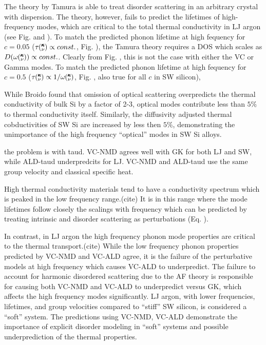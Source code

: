 \documentclass[aps,prb,twocolumn,superscriptaddress,amsmath,amssymb,floatfix]{revtex4}
\newcommand{\kv}{\mspace{-4.0mu}\left(\mspace{-8.0mu}
\begin{smallmatrix}&\pmb{\kappa} \\&\nu\end{smallmatrix}
\mspace{-3.0mu}\right)}
\begin{document}
The theory by Tamura is able to treat disorder scattering in an arbitrary 
crystal with dispersion. The theory, however, fails to predict the 
lifetimes of high-frequency modes, which are critical to the total 
thermal conductivity in LJ argon (see Fig. and ). To match the predicted 
phonon lifetime at high fequency for $c=0.05$ 
($\tau\kv \propto const.$, Fig. ), 
the Tamura theory requires a DOS which scales as 
$D(\omega\kv) \propto const.$. Clearly from Fig. , this is not the case 
with either the VC or Gamma modes. To match the predicted 
phonon lifetime at high fequency for $c=0.5$ 
($\tau\kv \propto 1/\omega\kv$, Fig. , also true for all $c$ in SW silicon), 

While Broido found that omission of optical scattering overpredicts 
the thermal 
conductivity of bulk Si by a factor of 2-3, 
optical modes contribute less than $5\%$ 
to thermal conductivity itself. Similarly, the diffusivity adjusted thermal 
cobductivities of SW Si are increased by less then $5\%$, demonstrating the 
unimportance of the high frequency ``optical'' modes in SW Si alloys.

the problem is with taud.  VC-NMD agrees well with GK for both LJ and SW, 
while ALD-taud underpredcits for LJ.  VC-NMD and ALD-taud use the same 
group velocity and classical specific heat.



High thermal conductivity materials tend to have a conductivity spectrum 
which is peaked in the low frequency range.(cite) 
It is in this range where the mode 
lifetimes follow closely the scalings with frequency which can be 
predicted by treating intrinsic and disorder scattering as 
perturbations (Eq. ).

In contrast, 
in LJ argon the high frequency phonon mode properties are critical 
to the thermal transport.(cite)  
While the low frequency phonon properties predicted by VC-NMD and 
VC-ALD agree, it is the failure of the perturbative models at 
high frequency which causes VC-ALD to underpredict. The failure 
to account for harmonic disordered scattering due to the AF theory 
is responsible for causing both VC-NMD and VC-ALD to underpredict 
versus GK, which affects the high frequency modes significantly. 
LJ argon, with lower 
frequencies, lifetimes, and group velocities compared to 
``stiff'' SW silicon, 
is considered a ``soft'' system. The predictions using 
VC-NMD, VC-ALD demonstrate the importance of explicit disorder 
modeling in ``soft'' systems and possible underprediction 
of the thermal properties.\cite{tian_phonon_2012}
\end{document}

